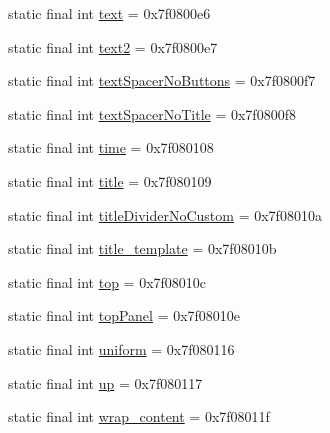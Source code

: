 \begin{DoxyCompactItemize}
\item 
static final int \mbox{\hyperlink{classandroid_1_1support_1_1v7_1_1appcompat_1_1_r_1_1id_a2930aafc4caa3944336307aaf845eefa}{text}} = 0x7f0800e6
\item 
static final int \mbox{\hyperlink{classandroid_1_1support_1_1v7_1_1appcompat_1_1_r_1_1id_ab9390bfca9faaba1e8692b82040e152d}{text2}} = 0x7f0800e7
\item 
static final int \mbox{\hyperlink{classandroid_1_1support_1_1v7_1_1appcompat_1_1_r_1_1id_a8ea861bc6460b6ef63f07beabc5cb74e}{text\+Spacer\+No\+Buttons}} = 0x7f0800f7
\item 
static final int \mbox{\hyperlink{classandroid_1_1support_1_1v7_1_1appcompat_1_1_r_1_1id_a65a1b7cb9dae5e4f54980d2dd6dc3e38}{text\+Spacer\+No\+Title}} = 0x7f0800f8
\item 
static final int \mbox{\hyperlink{classandroid_1_1support_1_1v7_1_1appcompat_1_1_r_1_1id_ae0962952dcceb61085f705f21bb7929c}{time}} = 0x7f080108
\item 
static final int \mbox{\hyperlink{classandroid_1_1support_1_1v7_1_1appcompat_1_1_r_1_1id_a6c5ab3c0af64adc83824ccd5a9619c44}{title}} = 0x7f080109
\item 
static final int \mbox{\hyperlink{classandroid_1_1support_1_1v7_1_1appcompat_1_1_r_1_1id_a9f52841478efd3906465f2ff95e2a5f0}{title\+Divider\+No\+Custom}} = 0x7f08010a
\item 
static final int \mbox{\hyperlink{classandroid_1_1support_1_1v7_1_1appcompat_1_1_r_1_1id_ad1a2ef4de6c56ea12952f3dcb5583365}{title\+\_\+template}} = 0x7f08010b
\item 
static final int \mbox{\hyperlink{classandroid_1_1support_1_1v7_1_1appcompat_1_1_r_1_1id_a58b826a2af9f77fc1bd9661682d629a3}{top}} = 0x7f08010c
\item 
static final int \mbox{\hyperlink{classandroid_1_1support_1_1v7_1_1appcompat_1_1_r_1_1id_a74344a9a6654c3e1e9647b9e800f3535}{top\+Panel}} = 0x7f08010e
\item 
static final int \mbox{\hyperlink{classandroid_1_1support_1_1v7_1_1appcompat_1_1_r_1_1id_a18c3191610b9d0a8da3eadc047cc9a6d}{uniform}} = 0x7f080116
\item 
static final int \mbox{\hyperlink{classandroid_1_1support_1_1v7_1_1appcompat_1_1_r_1_1id_a9aab36bc7e4cb601c12167a3b78ed738}{up}} = 0x7f080117
\item 
static final int \mbox{\hyperlink{classandroid_1_1support_1_1v7_1_1appcompat_1_1_r_1_1id_a5263ea8cbb699c84a7171895a696e0c1}{wrap\+\_\+content}} = 0x7f08011f
\end{DoxyCompactItemize}
